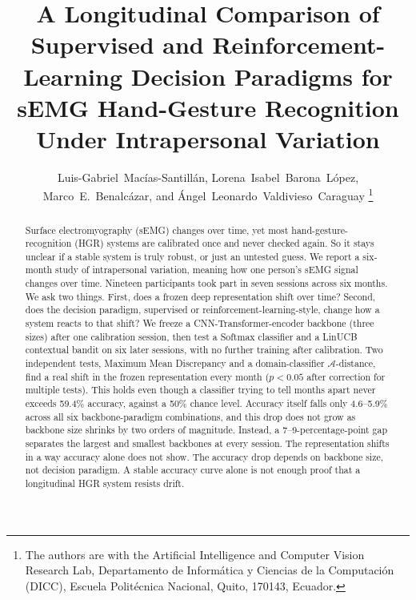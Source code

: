 \documentclass[journal]{IEEEtran}
\begin{document}
\title{A Longitudinal Comparison of Supervised and Reinforcement-Learning Decision Paradigms for sEMG Hand-Gesture Recognition Under Intrapersonal Variation}

\author{Luis-Gabriel~Mac\'ias-Santill\'an, Lorena~Isabel~Barona~L\'opez, Marco~E.~Benalc\'azar, and \'Angel~Leonardo~Valdivieso~Caraguay
\thanks{The authors are with the Artificial Intelligence and Computer Vision Research Lab, Departamento de Inform\'atica y Ciencias de la Computaci\'on (DICC), Escuela Polit\'ecnica Nacional, Quito, 170143, Ecuador.}}


\maketitle

\begin{abstract}
Surface electromyography (sEMG) changes over time, yet most hand-gesture-recognition (HGR) systems are calibrated once and never checked again. So it stays unclear if a stable system is truly robust, or just an untested guess. We report a six-month study of intrapersonal variation, meaning how one person's sEMG signal changes over time. Nineteen participants took part in seven sessions across six months. We ask two things. First, does a frozen deep representation shift over time? Second, does the decision paradigm, supervised or reinforcement-learning-style, change how a system reacts to that shift? We freeze a CNN-Transformer-encoder backbone (three sizes) after one calibration session, then test a Softmax classifier and a LinUCB contextual bandit on six later sessions, with no further training after calibration. Two independent tests, Maximum Mean Discrepancy and a domain-classifier $\mathcal{A}$-distance, find a real shift in the frozen representation every month ($p<0.05$ after correction for multiple tests). This holds even though a classifier trying to tell months apart never exceeds 59.4\% accuracy, against a 50\% chance level. Accuracy itself falls only 4.6--5.9\% across all six backbone-paradigm combinations, and this drop does not grow as backbone size shrinks by two orders of magnitude. Instead, a 7--9-percentage-point gap separates the largest and smallest backbones at every session. The representation shifts in a way accuracy alone does not show. The accuracy drop depends on backbone size, not decision paradigm. A stable accuracy curve alone is not enough proof that a longitudinal HGR system resists drift.
\end{abstract}
\end{document}
